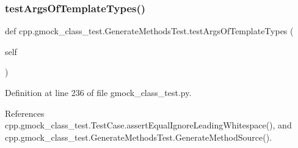 \mbox{\label{classcpp_1_1gmock__class__test_1_1GenerateMethodsTest_ade05313ccffe74f9eaa42fb66c14f702}} 
\subsubsection{\texorpdfstring{test\+Args\+Of\+Template\+Types()}{testArgsOfTemplateTypes()}}
{\footnotesize\ttfamily def cpp.\+gmock\+\_\+class\+\_\+test.\+Generate\+Methods\+Test.\+test\+Args\+Of\+Template\+Types (\begin{DoxyParamCaption}\item[{}]{self }\end{DoxyParamCaption})}



Definition at line 236 of file gmock\+\_\+class\+\_\+test.\+py.



References cpp.\+gmock\+\_\+class\+\_\+test.\+Test\+Case.\+assert\+Equal\+Ignore\+Leading\+Whitespace(), and cpp.\+gmock\+\_\+class\+\_\+test.\+Generate\+Methods\+Test.\+Generate\+Method\+Source().


